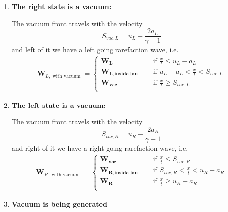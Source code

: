 \begin{enumerate}

	\item \textbf{The right state is a vacuum:}
	
		The vacuum front travels with the velocity
		\begin{equation}
			S_{vac, L} = u_L + \frac{2 a_L}{\gamma - 1}
		\end{equation}
		and left of it we have a left going rarefaction wave, i.e.
		\begin{align}
			\mathbf{W}_{L, \text{ with vacuum }} = 
				\begin{cases}
					\mathbf{W_L} & \quad \text{ if } \frac{x}{t} \leq u_L - a_L \\
					\mathbf{W_{L, \text{inside fan}}} & \quad \text{ if } u_L - a_L < \frac{x}{t} < S_{vac, L} \\
					\mathbf{W_{vac}} & \quad \text{ if } \frac{x}{t} \geq S_{vac, L}\\
				\end{cases}
		\end{align}
		
	\item \textbf{The left state is a vacuum:}
	
		The vacuum front travels with the velocity
		\begin{equation}
			S_{vac, R} = u_R - \frac{2 a_R}{\gamma - 1}
		\end{equation}
		and right of it we have a right going rarefaction wave, i.e.
		\begin{align}
			\mathbf{W}_{R, \text{ with vacuum }} = 
				\begin{cases}
					\mathbf{W_{vac}} & \quad \text{ if } \frac{x}{t} \leq S_{vac, R}\\
					\mathbf{W_{R, \text{inside fan}}} & \quad \text{ if } S_{vac, R} < \frac{x}{t} <   u_R + a_R\\
					\mathbf{W_R} & \quad \text{ if } \frac{x}{t} \geq u_R + a_R \\
				\end{cases}
		\end{align}
		
	\item \textbf{ Vacuum is being generated }
	

\end{enumerate}
